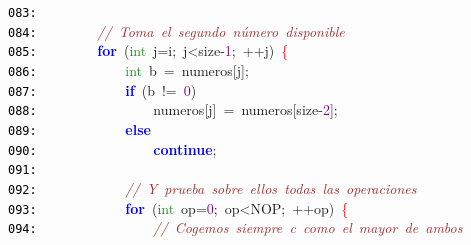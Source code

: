 \documentclass[a4paper,10pt]{scrartcl}
\begin{document}
{   \mbox{}\texttt{\textcolor{Black}{083:}} \ \ \ \  \\
   \mbox{}\texttt{\textcolor{Black}{084:}} \ \ \ \ \ \ \ \ \textit{\textcolor{Brown}{//\ Toma\ el\ segundo\ número\ disponible}} \\
   \mbox{}\texttt{\textcolor{Black}{085:}} \ \ \ \ \ \ \ \ \textbf{\textcolor{Blue}{for}}\ \textcolor{BrickRed}{(}\textcolor{ForestGreen}{int}\ j\textcolor{BrickRed}{=}i\textcolor{BrickRed}{;}\ j\textcolor{BrickRed}{\textless{}}size\textcolor{BrickRed}{-}\textcolor{Purple}{1}\textcolor{BrickRed}{;}\ \textcolor{BrickRed}{++}j\textcolor{BrickRed}{)}\ \textcolor{Red}{\{} \\
   \mbox{}\texttt{\textcolor{Black}{086:}} \ \ \ \ \ \ \ \ \ \ \ \ \textcolor{ForestGreen}{int}\ b\ \textcolor{BrickRed}{=}\ numeros\textcolor{BrickRed}{[}j\textcolor{BrickRed}{];} \\
   \mbox{}\texttt{\textcolor{Black}{087:}} \ \ \ \ \ \ \ \ \ \ \ \ \textbf{\textcolor{Blue}{if}}\ \textcolor{BrickRed}{(}b\ \textcolor{BrickRed}{!=}\ \textcolor{Purple}{0}\textcolor{BrickRed}{)} \\
   \mbox{}\texttt{\textcolor{Black}{088:}} \ \ \ \ \ \ \ \ \ \ \ \ \ \ \ \ numeros\textcolor{BrickRed}{[}j\textcolor{BrickRed}{]}\ \textcolor{BrickRed}{=}\ numeros\textcolor{BrickRed}{[}size\textcolor{BrickRed}{-}\textcolor{Purple}{2}\textcolor{BrickRed}{];} \\
   \mbox{}\texttt{\textcolor{Black}{089:}} \ \ \ \ \ \ \ \ \ \ \ \ \textbf{\textcolor{Blue}{else}} \\
   \mbox{}\texttt{\textcolor{Black}{090:}} \ \ \ \ \ \ \ \ \ \ \ \ \ \ \ \ \textbf{\textcolor{Blue}{continue}}\textcolor{BrickRed}{;} \\
   \mbox{}\texttt{\textcolor{Black}{091:}} \ \ \ \ \ \  \\
   \mbox{}\texttt{\textcolor{Black}{092:}} \ \ \ \ \ \ \ \ \ \ \ \ \textit{\textcolor{Brown}{//\ Y\ prueba\ sobre\ ellos\ todas\ las\ operaciones}} \\
   \mbox{}\texttt{\textcolor{Black}{093:}} \ \ \ \ \ \ \ \ \ \ \ \ \textbf{\textcolor{Blue}{for}}\ \textcolor{BrickRed}{(}\textcolor{ForestGreen}{int}\ op\textcolor{BrickRed}{=}\textcolor{Purple}{0}\textcolor{BrickRed}{;}\ op\textcolor{BrickRed}{\textless{}}NOP\textcolor{BrickRed}{;}\ \textcolor{BrickRed}{++}op\textcolor{BrickRed}{)}\ \textcolor{Red}{\{} \\
   \mbox{}\texttt{\textcolor{Black}{094:}} \ \ \ \ \ \ \ \ \ \ \ \ \ \ \ \ \textit{\textcolor{Brown}{//\ Cogemos\ siempre\ c\ como\ el\ mayor\ de\ ambos}} \\
}
\end{document}
